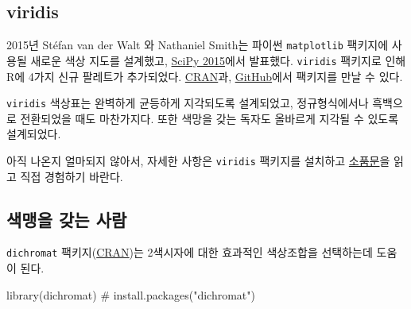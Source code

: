 \documentclass[
  letterpaper,
]{book}
\newenvironment{Shaded}{\begin{snugshade}}{\end{snugshade}}
\newcommand{\CommentTok}[1]{\textcolor[rgb]{0.37,0.37,0.37}{#1}}
\newcommand{\FunctionTok}[1]{\textcolor[rgb]{0.28,0.35,0.67}{#1}}
\newcommand{\NormalTok}[1]{\textcolor[rgb]{0.00,0.23,0.31}{#1}}
\begin{document}
\hypertarget{dataviz-viridis}{%
\subsection{viridis}\label{dataviz-viridis}}

2015년 Stéfan van der Walt 와 Nathaniel Smith는 파이썬
\texttt{matplotlib} 팩키지에 사용될 새로운 색상 지도를 설계했고,
\href{https://www.youtube.com/watch?v=xAoljeRJ3lU&feature=youtu.be}{SciPy
2015}에서 발표했다. \texttt{viridis} 팩키지로 인해 R에 4가지 신규
팔레트가 추가되었다.
\href{https://cran.r-project.org/web/packages/viridis/index.html}{CRAN}과,
\href{https://github.com/sjmgarnier/viridis}{GitHub}에서 팩키지를 만날
수 있다.

\begin{tcolorbox}[enhanced jigsaw, opacityback=0, opacitybacktitle=0.6, colback=white, rightrule=.15mm, coltitle=black, colframe=quarto-callout-note-color-frame, colbacktitle=quarto-callout-note-color!10!white, bottomrule=.15mm, bottomtitle=1mm, breakable, title=\textcolor{quarto-callout-note-color}{\faInfo}\hspace{0.5em}{노트}, titlerule=0mm, leftrule=.75mm, toptitle=1mm, left=2mm, arc=.35mm, toprule=.15mm]

\texttt{viridis} 색상표는 완벽하게 균등하게 지각되도록 설계되었고,
정규형식에서나 흑백으로 전환되었을 때도 마찬가지다. 또한 색망을 갖는
독자도 올바르게 지각될 수 있도록 설계되었다.

\end{tcolorbox}

아직 나온지 얼마되지 않아서, 자세한 사항은 \texttt{viridis} 팩키지를
설치하고
\href{https://cran.r-project.org/web/packages/viridis/vignettes/intro-to-viridis.html_document}{소품문}을
읽고 직접 경험하기 바란다.

\hypertarget{dataviz-viridis-blind}{%
\subsection{색맹을 갖는 사람}\label{dataviz-viridis-blind}}

\texttt{dichromat}
팩키지(\href{http://cran.r-project.org/web/packages/dichromat/}{CRAN})는
2색시자에 대한 효과적인 색상조합을 선택하는데 도움이 된다.

\begin{Shaded}
\begin{Highlighting}[]
\FunctionTok{library}\NormalTok{(dichromat) }\CommentTok{\# install.packages("dichromat")}
\end{Highlighting}
\end{Shaded}
\end{document}
